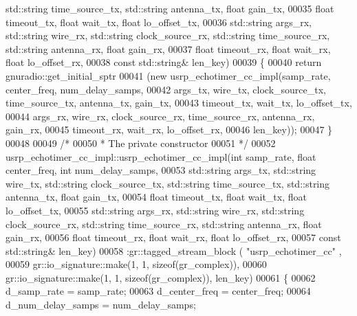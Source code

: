 \begin{DoxyCode}
      std::string time\_source\_tx, std::string antenna\_tx, \textcolor{keywordtype}{float} gain\_tx,
00035         \textcolor{keywordtype}{float} timeout\_tx, \textcolor{keywordtype}{float} wait\_tx, \textcolor{keywordtype}{float} lo\_offset\_tx,
00036         std::string args\_rx, std::string wire\_rx, std::string clock\_source\_rx, 
      std::string time\_source\_rx, std::string antenna\_rx, \textcolor{keywordtype}{float} gain\_rx,
00037         \textcolor{keywordtype}{float} timeout\_rx, \textcolor{keywordtype}{float} wait\_rx, \textcolor{keywordtype}{float} lo\_offset\_rx,
00038         \textcolor{keyword}{const} std::string& len\_key)
00039     \{
00040       \textcolor{keywordflow}{return} gnuradio::get\_initial\_sptr
00041         (\textcolor{keyword}{new} usrp_echotimer_cc_impl(samp\_rate, center\_freq, num\_delay\_samps,
00042         args\_tx, wire\_tx, clock\_source\_tx, time\_source\_tx, antenna\_tx, gain\_tx,
00043         timeout\_tx, wait\_tx, lo\_offset\_tx,
00044         args\_rx, wire\_rx, clock\_source\_rx, time\_source\_rx, antenna\_rx, gain\_rx,
00045         timeout\_rx, wait\_rx, lo\_offset\_rx,
00046         len\_key));
00047     \}
00048 
00049     \textcolor{comment}{/*}
00050 \textcolor{comment}{     * The private constructor}
00051 \textcolor{comment}{     */}
00052     usrp_echotimer_cc_impl::usrp_echotimer_cc_impl(\textcolor{keywordtype}{int} samp_rate, \textcolor{keywordtype}{float} 
      center_freq, \textcolor{keywordtype}{int} num\_delay\_samps,
00053         std::string args\_tx, std::string wire\_tx, std::string clock\_source\_tx, 
      std::string time\_source\_tx, std::string antenna\_tx, \textcolor{keywordtype}{float} gain\_tx,
00054         \textcolor{keywordtype}{float} timeout\_tx, \textcolor{keywordtype}{float} wait\_tx, \textcolor{keywordtype}{float} lo\_offset\_tx,
00055         std::string args\_rx, std::string wire\_rx, std::string clock\_source\_rx, 
      std::string time\_source\_rx, std::string antenna\_rx, \textcolor{keywordtype}{float} gain\_rx,
00056         \textcolor{keywordtype}{float} timeout\_rx, \textcolor{keywordtype}{float} wait\_rx, \textcolor{keywordtype}{float} lo\_offset\_rx,
00057         \textcolor{keyword}{const} std::string& len\_key)
00058     :gr::tagged\_stream\_block ( \textcolor{stringliteral}{"usrp\_echotimer\_cc"} ,
00059               gr::io\_signature::make(1, 1, sizeof(gr\_complex)),
00060               gr::io\_signature::make(1, 1, sizeof(gr\_complex)), len\_key)
00061     \{
00062     d_samp_rate = samp_rate;
00063         d_center_freq = center_freq;
00064         d_num_delay_samps = num\_delay\_samps;

\end{DoxyCode}
